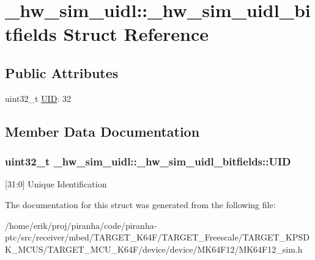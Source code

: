 \hypertarget{struct__hw__sim__uidl_1_1__hw__sim__uidl__bitfields}{}\section{\+\_\+hw\+\_\+sim\+\_\+uidl\+:\+:\+\_\+hw\+\_\+sim\+\_\+uidl\+\_\+bitfields Struct Reference}
\label{struct__hw__sim__uidl_1_1__hw__sim__uidl__bitfields}
\subsection*{Public Attributes}
\begin{DoxyCompactItemize}
\item 
uint32\+\_\+t \hyperlink{struct__hw__sim__uidl_1_1__hw__sim__uidl__bitfields_aa6e822fdac7ad8badf4f75d69351347b}{U\+ID}\+: 32
\end{DoxyCompactItemize}


\subsection{Member Data Documentation}
\subsubsection[{\texorpdfstring{U\+ID}{UID}}]{\setlength{\rightskip}{0pt plus 5cm}uint32\+\_\+t \+\_\+hw\+\_\+sim\+\_\+uidl\+::\+\_\+hw\+\_\+sim\+\_\+uidl\+\_\+bitfields\+::\+U\+ID}\hypertarget{struct__hw__sim__uidl_1_1__hw__sim__uidl__bitfields_aa6e822fdac7ad8badf4f75d69351347b}{}\label{struct__hw__sim__uidl_1_1__hw__sim__uidl__bitfields_aa6e822fdac7ad8badf4f75d69351347b}
\mbox{[}31\+:0\mbox{]} Unique Identification 

The documentation for this struct was generated from the following file\+:\begin{DoxyCompactItemize}
\item 
/home/erik/proj/piranha/code/piranha-\/ptc/src/receiver/mbed/\+T\+A\+R\+G\+E\+T\+\_\+\+K64\+F/\+T\+A\+R\+G\+E\+T\+\_\+\+Freescale/\+T\+A\+R\+G\+E\+T\+\_\+\+K\+P\+S\+D\+K\+\_\+\+M\+C\+U\+S/\+T\+A\+R\+G\+E\+T\+\_\+\+M\+C\+U\+\_\+\+K64\+F/device/device/\+M\+K64\+F12/M\+K64\+F12\+\_\+sim.\+h\end{DoxyCompactItemize}
